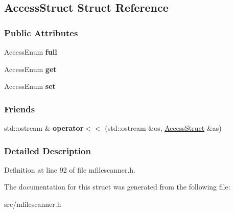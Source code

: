 \hypertarget{struct_access_struct}{}\subsection{Access\+Struct Struct Reference}
\label{struct_access_struct}
\subsubsection*{Public Attributes}
\begin{DoxyCompactItemize}
\item 
\hypertarget{struct_access_struct_a8c0c074c102b57d585c4d989ff6680d6}{}Access\+Enum {\bfseries full}\label{struct_access_struct_a8c0c074c102b57d585c4d989ff6680d6}

\item 
\hypertarget{struct_access_struct_a7f4f2e4376710292b338fda24ce5ed8f}{}Access\+Enum {\bfseries get}\label{struct_access_struct_a7f4f2e4376710292b338fda24ce5ed8f}

\item 
\hypertarget{struct_access_struct_ae6a0ef9e9298bb4cc8f9a91d4bf29273}{}Access\+Enum {\bfseries set}\label{struct_access_struct_ae6a0ef9e9298bb4cc8f9a91d4bf29273}

\end{DoxyCompactItemize}
\subsubsection*{Friends}
\begin{DoxyCompactItemize}
\item 
\hypertarget{struct_access_struct_aa5a9f6936c31a2e6dfd6260afcc706cb}{}std\+::ostream \& {\bfseries operator$<$$<$} (std\+::ostream \&os, \hyperlink{struct_access_struct}{Access\+Struct} \&as)\label{struct_access_struct_aa5a9f6936c31a2e6dfd6260afcc706cb}

\end{DoxyCompactItemize}


\subsubsection{Detailed Description}


Definition at line 92 of file mfilescanner.\+h.



The documentation for this struct was generated from the following file\+:\begin{DoxyCompactItemize}
\item 
src/mfilescanner.\+h\end{DoxyCompactItemize}
